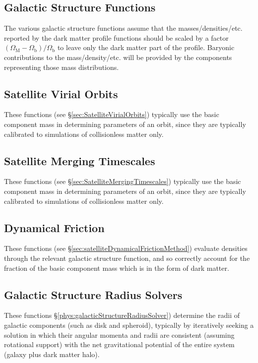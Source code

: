 \subsection{Galactic Structure Functions}

The various galactic structure functions assume that the masses/densities/etc. reported by the dark matter profile functions should be scaled by a factor $(\Omega_\mathrm{M}-\Omega_\mathrm{b})/\Omega_\mathrm{b}$ to leave only the dark matter part of the profile. Baryonic contributions to the mass/density/etc. will be provided by the components representing those mass distributions.

\subsection{Satellite Virial Orbits}

These functions (see \S\ref{sec:SatelliteVirialOrbits}) typically use the {\normalfont \ttfamily basic} component mass in determining parameters of an orbit, since they are typically calibrated to simulations of collisionless matter only.

\subsection{Satellite Merging Timescales}

These functions (see \S\ref{sec:SatelliteMergingTimescales}) typically use the {\normalfont \ttfamily basic} component mass in determining parameters of an orbit, since they are typically calibrated to simulations of collisionless matter only.

\subsection{Dynamical Friction}

These functions (see \S\ref{sec:satelliteDynamicalFrictionMethod}) evaluate densities through the relevant galactic structure function, and so correctly account for the fraction of the {\normalfont \ttfamily basic} component mass which is in the form of dark matter.

\subsection{Galactic Structure Radius Solvers}

These functions \S\ref{phys:galacticStructureRadiusSolver}) determine the radii of galactic components (such as disk and spheroid), typically by iteratively seeking a solution in which their angular momenta and radii are consistent (assuming rotational support) with the net gravitational potential of the entire system (galaxy plus dark matter halo).

